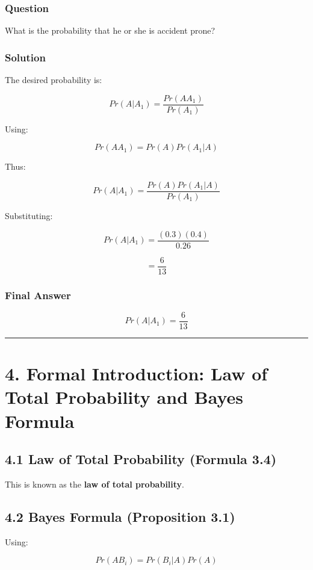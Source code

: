 \documentclass[12pt]{article}
\begin{document}
\subsubsection*{\textbf{Question}}

What is the probability that he or she is accident prone?

\subsubsection*{\textbf{Solution}}

The desired probability is:

\[
Pr(A|A_1) = \frac{Pr(AA_1)}{Pr(A_1)}
\]

Using:

\[
Pr(AA_1) = Pr(A)Pr(A_1|A)
\]

Thus:

\[
Pr(A|A_1) = \frac{Pr(A)Pr(A_1|A)}{Pr(A_1)}
\]

Substituting:

\[
Pr(A|A_1) = \frac{(0.3)(0.4)}{0.26}
\]

\[
= \frac{6}{13}
\]

\subsubsection*{\textbf{Final Answer}}

\[
Pr(A|A_1) = \frac{6}{13}
\]

\hrule
\vspace{1em}

\section*{\textbf{4. Formal Introduction: Law of Total Probability and Bayes Formula}}

\subsection*{\textbf{4.1 Law of Total Probability (Formula 3.4)}}

This is known as the \textbf{law of total probability}.

\subsection*{\textbf{4.2 Bayes Formula (Proposition 3.1)}}

Using:

\[
Pr(AB_i) = Pr(B_i|A)Pr(A)
\]
\end{document}
